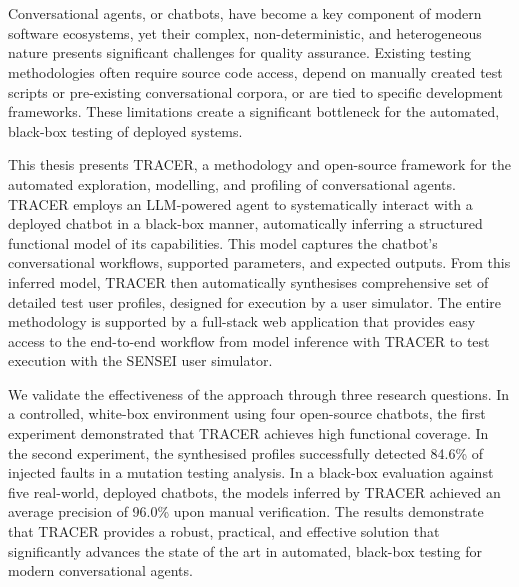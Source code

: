 \chapter{\abstractname}

Conversational agents, or chatbots,
have become a key component of modern software ecosystems,
yet their complex, non-deterministic, and heterogeneous nature
presents significant challenges for quality assurance.
Existing testing methodologies
often require source code access,
depend on manually created test scripts or pre-existing conversational corpora,
or are tied to specific development frameworks.
These limitations create a significant bottleneck
for the automated, black-box testing of deployed systems.

This thesis presents \acf{TRACER},
a methodology and open-source framework
for the automated exploration, modelling, and profiling of conversational agents.
\ac{TRACER} employs an \ac{LLM}-powered agent
to systematically interact with a deployed chatbot in a black-box manner,
automatically inferring a structured functional model of its capabilities.
This model captures the chatbot's
conversational workflows, supported parameters, and expected outputs.
From this inferred model,
\ac{TRACER} then automatically synthesises
comprehensive set of detailed test user profiles,
designed for execution by a user simulator.
The entire methodology is supported by a full-stack web application
that provides easy access to the end-to-end workflow
from model inference with \ac{TRACER} to test execution with the SENSEI user simulator.

We validate the effectiveness of the approach through three research questions.
In a controlled, white-box environment using four open-source chatbots,
the first experiment demonstrated that \ac{TRACER} achieves high functional coverage.
In the second experiment,
the synthesised profiles successfully detected 84.6\% of injected faults in a mutation testing analysis.
In a black-box evaluation against five real-world, deployed chatbots,
the models inferred by \ac{TRACER} achieved an average precision of 96.0\% upon manual verification.
The results demonstrate that \ac{TRACER} provides a robust, practical, and effective solution
that significantly advances the state of the art in automated, black-box testing for modern conversational agents.

